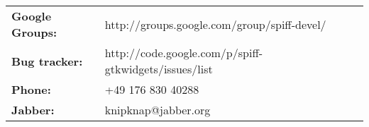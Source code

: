 \begin{tabular}{ll}
{\bf Google Groups:} & http://groups.google.com/group/spiff-devel/ \\
{\bf Bug tracker:}   & http://code.google.com/p/spiff-gtkwidgets/issues/list \\
{\bf Phone:}         & +49 176 830 40288 \\
{\bf Jabber:}        & knipknap@jabber.org
\end{tabular}
